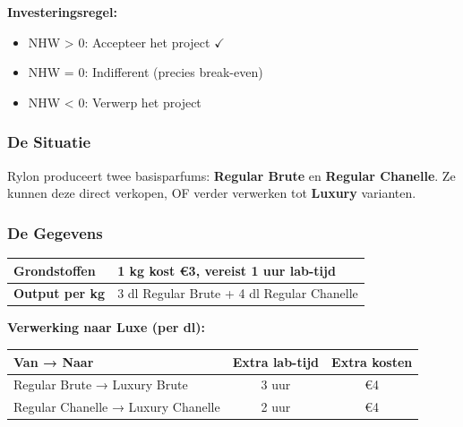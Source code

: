 \documentclass[a4paper,11pt]{article}
\begin{document}
\begin{oefenblok}
\begin{center}
{\begin{minipage}{0.9\textwidth}
\vspace{0.2cm}

\textbf{Investeringsregel:}
\begin{itemize}
    \item NHW > 0: Accepteer het project $\checkmark$
    \item NHW = 0: Indifferent (precies break-even)
    \item NHW < 0: Verwerp het project
\end{itemize}
\end{minipage}
}
\end{center}

\end{oefenblok}


\begin{oefenblok}[title=Lineair Programmeren — Rylon Parfums]

\subsubsection*{De Situatie}
Rylon produceert twee basisparfums: \textbf{Regular Brute} en \textbf{Regular Chanelle}. Ze kunnen deze direct verkopen, OF verder verwerken tot \textbf{Luxury} varianten.

\subsubsection*{De Gegevens}

\begin{center}
\begin{tabular}{|l|l|}
\hline
\textbf{Grondstoffen} & 1 kg kost €3, vereist 1 uur lab-tijd \\
\hline
\textbf{Output per kg} & 3 dl Regular Brute + 4 dl Regular Chanelle \\
\hline
\end{tabular}
\end{center}

\textbf{Verwerking naar Luxe (per dl):}
\begin{center}
\begin{tabular}{|l|c|c|}
\hline
\textbf{Van → Naar} & \textbf{Extra lab-tijd} & \textbf{Extra kosten} \\
\hline
Regular Brute → Luxury Brute & 3 uur & €4 \\
\hline
Regular Chanelle → Luxury Chanelle & 2 uur & €4 \\
\hline
\end{tabular}
\end{center}


\end{oefenblok}
\end{document}

